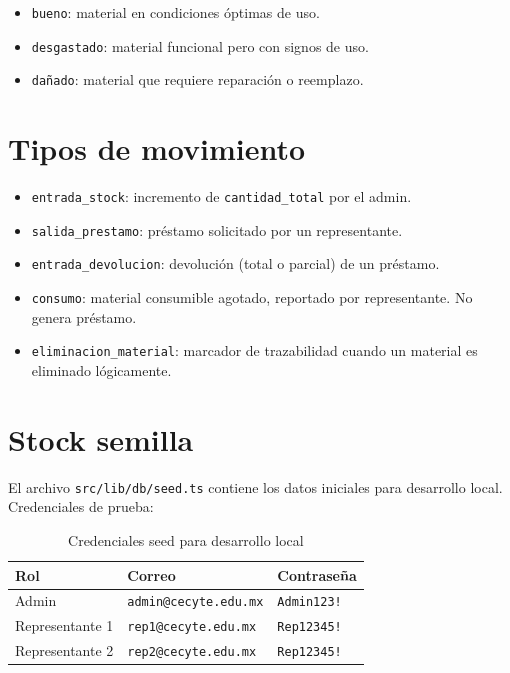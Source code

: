 \documentclass[12pt,a4paper,oneside]{report}
\newcommand{\file}[1]{\texttt{\color{cecyteDark}#1}}
\begin{document}
\begin{itemize}
  \item \file{bueno}: material en condiciones óptimas de uso.
  \item \file{desgastado}: material funcional pero con signos de uso.
  \item \file{dañado}: material que requiere reparación o reemplazo.
\end{itemize}

\section{Tipos de movimiento}

\begin{itemize}
  \item \file{entrada\_stock}: incremento de \file{cantidad\_total} por el admin.
  \item \file{salida\_prestamo}: préstamo solicitado por un representante.
  \item \file{entrada\_devolucion}: devolución (total o parcial) de un préstamo.
  \item \file{consumo}: material consumible agotado, reportado por representante. No genera préstamo.
  \item \file{eliminacion\_material}: marcador de trazabilidad cuando un material es eliminado lógicamente.
\end{itemize}

\section{Stock semilla}

El archivo \file{src/lib/db/seed.ts} contiene los datos iniciales para desarrollo local. Credenciales de prueba:

\begin{table}[H]
\centering
\caption{Credenciales seed para desarrollo local}
\begin{tabular}{@{}L{4cm}L{6cm}L{5.5cm}@{}}
\toprule
{}
\textbf{Rol} & \textbf{Correo} & \textbf{Contraseña} \\
\midrule
Admin            & \file{admin@cecyte.edu.mx}  & \file{Admin123!} \\
Representante 1  & \file{rep1@cecyte.edu.mx}   & \file{Rep12345!} \\
Representante 2  & \file{rep2@cecyte.edu.mx}   & \file{Rep12345!} \\
\bottomrule
\end{tabular}
\end{table}
\end{document}
